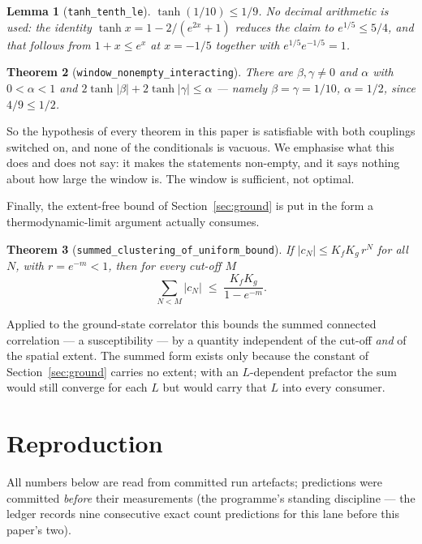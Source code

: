\documentclass[11pt]{article}
\newtheorem{theorem}{Theorem}[section]
\newtheorem{lemma}[theorem]{Lemma}
\newcommand{\lean}[1]{\texttt{#1}}
\begin{document}
\begin{lemma}[\lean{tanh\_tenth\_le}]
$\tanh(1/10) \le 1/9$.  No decimal arithmetic is used: the identity
$\tanh x = 1 - 2/(e^{2x}+1)$ reduces the claim to $e^{1/5} \le 5/4$,
and that follows from $1+x \le e^x$ at $x = -1/5$ together with
$e^{1/5}e^{-1/5} = 1$.
\end{lemma}

\begin{theorem}[\lean{window\_nonempty\_interacting}]
There are $\beta,\gamma \ne 0$ and $\alpha$ with $0<\alpha<1$ and
$2\tanh|\beta| + 2\tanh|\gamma| \le \alpha$ --- namely
$\beta = \gamma = 1/10$, $\alpha = 1/2$, since $4/9 \le 1/2$.
\end{theorem}

So the hypothesis of every theorem in this paper is satisfiable with both
couplings switched on, and none of the conditionals is vacuous.  We
emphasise what this does and does not say: it makes the statements
non-empty, and it says nothing about how large the window is.  The window
is sufficient, not optimal.

Finally, the extent-free bound of Section~\ref{sec:ground} is put in the
form a thermodynamic-limit argument actually consumes.

\begin{theorem}[\lean{summed\_clustering\_of\_uniform\_bound}]
If $\lvert c_N\rvert \le K_fK_g\,r^N$ for all $N$, with $r = e^{-m} < 1$,
then for every cut-off $M$
\[
\sum_{N<M} \lvert c_N\rvert \;\le\; \frac{K_fK_g}{1 - e^{-m}} .
\]
\end{theorem}

Applied to the ground-state correlator this bounds the summed connected
correlation --- a susceptibility --- by a quantity independent of the
cut-off \emph{and} of the spatial extent.  The summed form exists only
because the constant of Section~\ref{sec:ground} carries no extent; with
an $L$-dependent prefactor the sum would still converge for each $L$ but
would carry that $L$ into every consumer.

\section{Reproduction}\label{sec:repro}
All numbers below are read from committed run artefacts; predictions
were committed \emph{before} their measurements (the programme's
standing discipline --- the ledger records nine consecutive exact
count predictions for this lane before this paper's two).
\end{document}
